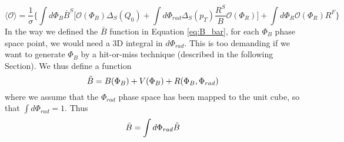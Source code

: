 \begin{equation}
    \langle\mathscr{O}\rangle = \frac{1}{\sigma}\bigg\{\int d\Phi_B \bar{B}^S \bigg[\mathscr{O}(\Phi_B)\Delta_S(Q_0) + \int d\Phi_{rad}\Delta_S(p_T)\frac{R^S}{B}\mathscr{O}(\Phi_R) \bigg] + \int d\Phi_R \mathscr{O}(\Phi_R)R^F\bigg\}
\end{equation}
In the way we defined the $\bar{B}$ function in Equation \ref{eq:B_bar}, for each $\Phi_B$ phase space point, we would need a 3D integral in $d\Phi_{rad}$. This is too demanding if we want to generate $\Phi_B$ by a hit-or-miss technique (described in the following Section). We thus define a function
\begin{equation}
    \Tilde{B} = B(\Phi_B) + V(\Phi_B) + R(\Phi_B, \Phi_{rad})
\end{equation}
where we assume that the $\Phi_{rad}$ phase space has been mapped to the unit cube, so that $\int d\Phi_{rad} = 1$. Thus
\begin{equation}
    \bar{B} = \int d\Phi_{rad} \Tilde{B}
\end{equation}
